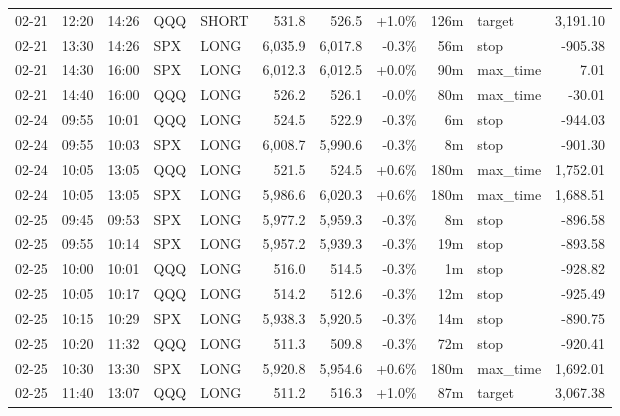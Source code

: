 \documentclass[11pt,a4paper,twoside]{article}
\begin{document}
\begin{center}
\begin{longtable}{>{\color{txtmain}}l l l l l r r r r >{\color{txtmain}}l r}
02-21 & 12:20 & 14:26 & QQQ & SHORT & 531.8 & 526.5 & \textcolor{wingreen}{+1.0\%} & 126m & target & \textcolor{wingreen}{3,191.10} \\
02-21 & 13:30 & 14:26 & SPX & LONG & 6,035.9 & 6,017.8 & \textcolor{lossred}{-0.3\%} & 56m & stop & \textcolor{lossred}{-905.38} \\
02-21 & 14:30 & 16:00 & SPX & LONG & 6,012.3 & 6,012.5 & \textcolor{wingreen}{+0.0\%} & 90m & max\_time & \textcolor{wingreen}{7.01} \\
02-21 & 14:40 & 16:00 & QQQ & LONG & 526.2 & 526.1 & \textcolor{lossred}{-0.0\%} & 80m & max\_time & \textcolor{lossred}{-30.01} \\
02-24 & 09:55 & 10:01 & QQQ & LONG & 524.5 & 522.9 & \textcolor{lossred}{-0.3\%} & 6m & stop & \textcolor{lossred}{-944.03} \\
02-24 & 09:55 & 10:03 & SPX & LONG & 6,008.7 & 5,990.6 & \textcolor{lossred}{-0.3\%} & 8m & stop & \textcolor{lossred}{-901.30} \\
02-24 & 10:05 & 13:05 & QQQ & LONG & 521.5 & 524.5 & \textcolor{wingreen}{+0.6\%} & 180m & max\_time & \textcolor{wingreen}{1,752.01} \\
02-24 & 10:05 & 13:05 & SPX & LONG & 5,986.6 & 6,020.3 & \textcolor{wingreen}{+0.6\%} & 180m & max\_time & \textcolor{wingreen}{1,688.51} \\
02-25 & 09:45 & 09:53 & SPX & LONG & 5,977.2 & 5,959.3 & \textcolor{lossred}{-0.3\%} & 8m & stop & \textcolor{lossred}{-896.58} \\
02-25 & 09:55 & 10:14 & SPX & LONG & 5,957.2 & 5,939.3 & \textcolor{lossred}{-0.3\%} & 19m & stop & \textcolor{lossred}{-893.58} \\
02-25 & 10:00 & 10:01 & QQQ & LONG & 516.0 & 514.5 & \textcolor{lossred}{-0.3\%} & 1m & stop & \textcolor{lossred}{-928.82} \\
02-25 & 10:05 & 10:17 & QQQ & LONG & 514.2 & 512.6 & \textcolor{lossred}{-0.3\%} & 12m & stop & \textcolor{lossred}{-925.49} \\
02-25 & 10:15 & 10:29 & SPX & LONG & 5,938.3 & 5,920.5 & \textcolor{lossred}{-0.3\%} & 14m & stop & \textcolor{lossred}{-890.75} \\
02-25 & 10:20 & 11:32 & QQQ & LONG & 511.3 & 509.8 & \textcolor{lossred}{-0.3\%} & 72m & stop & \textcolor{lossred}{-920.41} \\
02-25 & 10:30 & 13:30 & SPX & LONG & 5,920.8 & 5,954.6 & \textcolor{wingreen}{+0.6\%} & 180m & max\_time & \textcolor{wingreen}{1,692.01} \\
02-25 & 11:40 & 13:07 & QQQ & LONG & 511.2 & 516.3 & \textcolor{wingreen}{+1.0\%} & 87m & target & \textcolor{wingreen}{3,067.38} \\

\end{longtable}
\end{center}
\end{document}

